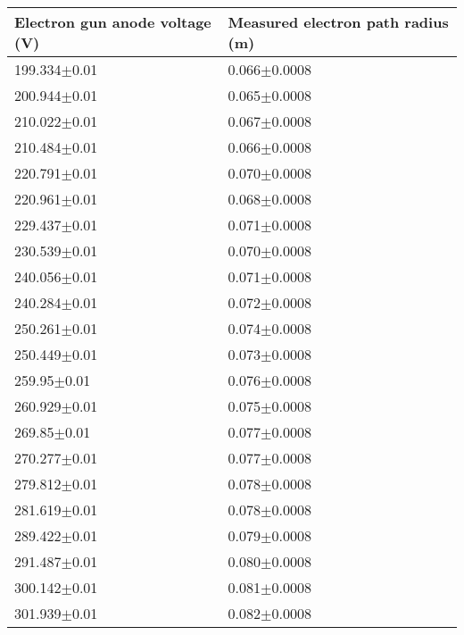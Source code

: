 \begin{tabular}{|p{} | p{} | }
\hline
Electron gun anode voltage (V) & Measured electron path radius (m)\\
\hline
199.334$\pm$0.01&0.066$\pm$0.0008\\
200.944$\pm$0.01&0.065$\pm$0.0008\\
210.022$\pm$0.01&0.067$\pm$0.0008\\
210.484$\pm$0.01&0.066$\pm$0.0008\\
220.791$\pm$0.01&0.070$\pm$0.0008\\
220.961$\pm$0.01&0.068$\pm$0.0008\\
229.437$\pm$0.01&0.071$\pm$0.0008\\
230.539$\pm$0.01&0.070$\pm$0.0008\\
240.056$\pm$0.01&0.071$\pm$0.0008\\
240.284$\pm$0.01&0.072$\pm$0.0008\\
250.261$\pm$0.01&0.074$\pm$0.0008\\
250.449$\pm$0.01&0.073$\pm$0.0008\\
259.95$\pm$0.01&0.076$\pm$0.0008\\
260.929$\pm$0.01&0.075$\pm$0.0008\\
269.85$\pm$0.01&0.077$\pm$0.0008\\
270.277$\pm$0.01&0.077$\pm$0.0008\\
279.812$\pm$0.01&0.078$\pm$0.0008\\
281.619$\pm$0.01&0.078$\pm$0.0008\\
289.422$\pm$0.01&0.079$\pm$0.0008\\
291.487$\pm$0.01&0.080$\pm$0.0008\\
300.142$\pm$0.01&0.081$\pm$0.0008\\
301.939$\pm$0.01&0.082$\pm$0.0008\\
\hline
\end{tabular}
